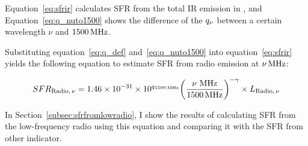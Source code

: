 Equation~\ref{eq:sfrir} calculates SFR from the total IR emission in \citet{Murphy2011}, and Equation~\ref{eq:q_nuto1500} shows the difference of the $q_{\nu}$ between a certain wavelength $\nu$ and $1500\,\mathrm{MHz}$.

Substituting equation~\ref{eq:q_def} and~\ref{eq:q_nuto1500} into equation~\ref{eq:sfrir} yields the following equation to estimate SFR from radio emission at $\nu\,\mathrm{MHz}$:

\begin{equation}\label{eq:sfrfromradio}
    SFR_{\mathrm{Radio},\,\nu} = 1.46\times10^{-31}\times 10^{q_{\mathrm{1500\,\mathrm{MHz}}}} {\left(\frac{\nu\,\,\mathrm{MHz}}{1500\,\mathrm{MHz}}\right)}^{-\gamma} \times L_{\mathrm{Radio},\,\nu}
\end{equation}

In Section~\ref{subsec:sfrfromlowradio}, I show the results of calculating SFR from the low-frequency radio using this equation and comparing it with the SFR from other indicator.



%
%
